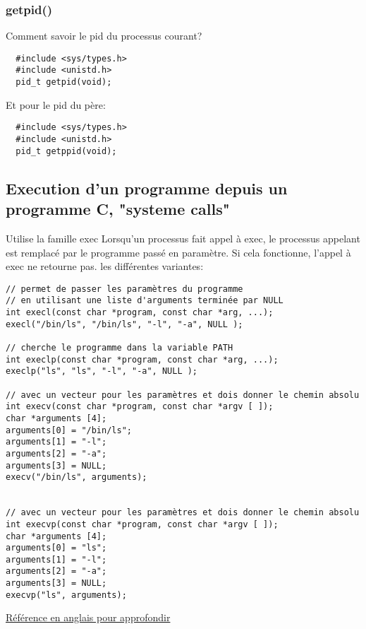 \documentclass[a4paper]{article}
\begin{document}
\subsubsection{getpid()}
Comment savoir le pid du processus courant?
\begin{lstlisting}
  #include <sys/types.h>
  #include <unistd.h>
  pid_t getpid(void);
\end{lstlisting}
Et pour le pid du père:
\begin{lstlisting}
  #include <sys/types.h>
  #include <unistd.h>
  pid_t getppid(void);
\end{lstlisting}
\subsection{Execution d'un programme depuis un programme C, "systeme calls"}
Utilise la famille exec\newline
Lorsqu'un processus fait appel à exec, le processus appelant est remplacé par le programme passé en paramètre. Si cela fonctionne, l'appel à exec ne retourne pas.\newline
les différentes variantes:
\begin{lstlisting}
// permet de passer les paramètres du programme
// en utilisant une liste d'arguments terminée par NULL
int execl(const char *program, const char *arg, ...);
execl("/bin/ls", "/bin/ls", "-l", "-a", NULL );

// cherche le programme dans la variable PATH
int execlp(const char *program, const char *arg, ...);
execlp("ls", "ls", "-l", "-a", NULL );

// avec un vecteur pour les paramètres et dois donner le chemin absolu
int execv(const char *program, const char *argv [ ]);
char *arguments [4];
arguments[0] = "/bin/ls";
arguments[1] = "-l";
arguments[2] = "-a";
arguments[3] = NULL;
execv("/bin/ls", arguments);


// avec un vecteur pour les paramètres et dois donner le chemin absolu
int execvp(const char *program, const char *argv [ ]);
char *arguments [4];
arguments[0] = "ls";
arguments[1] = "-l";
arguments[2] = "-a";
arguments[3] = NULL;
execvp("ls", arguments);
\end{lstlisting}
\href{http://pubs.opengroup.org/onlinepubs/9699919799/functions/exec.html}{Référence en anglais pour approfondir}
\end{document}
